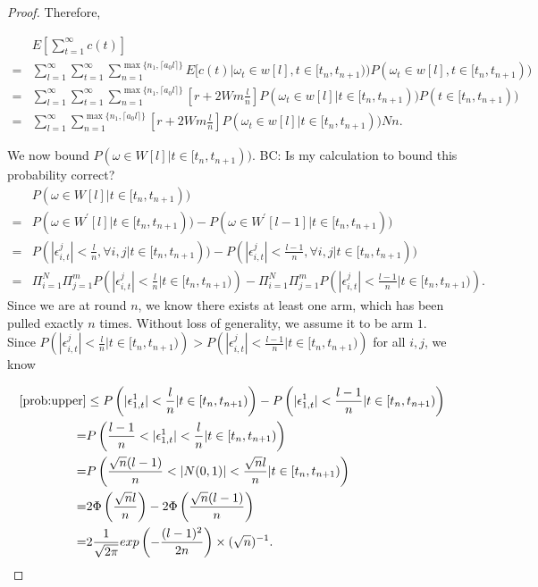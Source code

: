 \documentclass{article}
\newcommand{\bccomment}[1]{{\color{blue}BC: #1}}
\begin{document}
\begin{proof}
Therefore,

\begin{align}
&E\left[\sum_{t=1}^{\infty}c(t)\right] \nonumber\\
=&\sum_{l=1}^{\infty}\sum_{t=1}^{\infty}\sum_{n=1}^{\max\{n_1,\lceil a_0 l\rceil\}}E[c(t)|\omega_t\in w[l],t\in [t_n,t_{n+1}))P(\omega_t\in w[l],t\in [t_n,t_{n+1})) \nonumber \\
=&\sum_{l=1}^{\infty}\sum_{t=1}^{\infty}\sum_{n=1}^{\max\{n_1,\lceil a_0 l\rceil\}}\left[r+2Wm\frac{l}{n}\right]P(\omega_t\in w[l]|t\in [t_n,t_{n+1}))P(t\in [t_n,t_{n+1})) \nonumber \\
=&\sum_{l=1}^{\infty}\sum_{n=1}^{\max\{n_1,\lceil a_0 l\rceil\}}\left[r+2Wm\frac{l}{n}\right]P(\omega_t\in w[l]|t\in [t_n,t_{n+1}))Nn. \nonumber
\end{align}

We now bound $P(\omega\in W[l]|t\in[t_{n},t_{n+1}))$. \bccomment{Is my calculation to bound this probability correct?}
\begin{align}
&P(\omega\in W[l]|t\in[t_{n},t_{n+1})) \nonumber \\
=&P(\omega\in W^{'}[l]|t\in[t_{n},t_{n+1}))- P(\omega\in W^{'}[l-1]|t\in[t_{n},t_{n+1})) \nonumber \\
=&P(|\epsilon_{i,t}^{j}|<\frac{l}{n}, \forall i,j|t\in[t_n,t_{n+1}))-P(|\epsilon_{i,t}^{j}|<\frac{l-1}{n}, \forall i,j|t\in[t_n,t_{n+1})) \nonumber \\
=&\Pi_{i=1}^{N}\Pi_{j=1}^{m}P\left(|\epsilon_{i,t}^{j}|<\frac{l}{n}|t\in[t_n,t_{n+1})\right)-\Pi_{i=1}^{N}\Pi_{j=1}^{m}P\left(|\epsilon_{i,t}^{j}|<\frac{l-1}{n}|t\in[t_n,t_{n+1})\right). \label{prob:upper}
\end{align}
Since we are at round $n$, we know there exists at least one arm, which has been pulled exactly $n$ times. Without loss of generality, we assume it to be arm $1$. Since $P\left(|\epsilon_{i,t}^{j}|<\frac{l}{n}|t\in[t_n,t_{n+1})\right)> P\left(|\epsilon_{i,t}^{j}|<\frac{l-1}{n}|t\in[t_n,t_{n+1})\right)$ for all $i,j$, we know

\begin{align}
\eqref{prob:upper}&\leq P\left(|\epsilon_{1,t}^{1}|<\frac{l}{n}|t\in[t_n,t_{n+1})\right)-P\left(|\epsilon_{1,t}^{1}|<\frac{l-1}{n}|t\in[t_n,t_{n+1})\right) \nonumber \\
=&P\left(\frac{l-1}{n}<|\epsilon_{1,t}^{1}|<\frac{l}{n}|t\in[t_n,t_{n+1})\right) \nonumber \\
=&P\left(\frac{\sqrt{n}(l-1)}{n}<|N(0,1)|<\frac{\sqrt{n}l}{n}|t\in[t_n,t_{n+1})\right) \nonumber \\
=&2\Phi\left(\frac{\sqrt{n}l}{n}\right)-2\Phi\left(\frac{\sqrt{n}(l-1)}{n}\right) \nonumber \\
=&2 \frac{1}{\sqrt{2\pi}}exp\left(-\frac{(l-1)^2}{2n}\right)\times (\sqrt{n})^{-1}. \nonumber
\end{align}


\end{proof}
\end{document}
